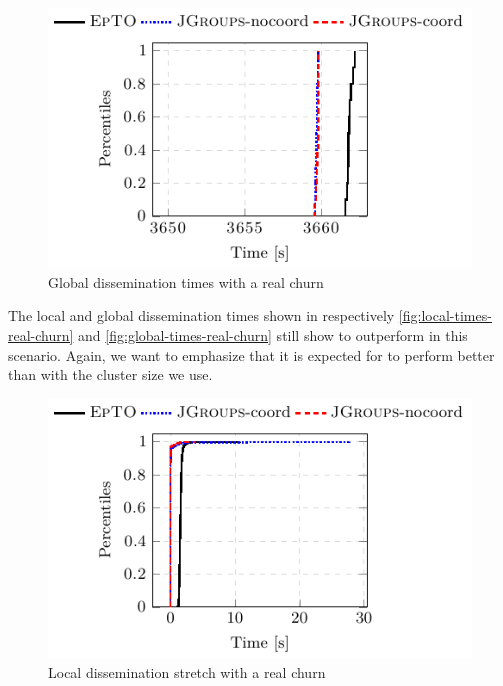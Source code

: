 \begin{figure}[hpt]
	\centering
	\includegraphics[width=\linewidth]{figures/global-times-real-churn.pdf}
	\vspace{-2mm} 
	\caption{Global dissemination times with a real churn}
	\vspace{-2mm} 
	\label{fig:global-times-real-churn} 
\end{figure}
The local and global dissemination times shown in respectively \autoref{fig:local-times-real-churn} and \autoref{fig:global-times-real-churn} still show \jgroups to outperform \epto in this scenario. Again, we want to emphasize that it is expected for \jgroups to perform better than \epto with the cluster size we use.
\par
\begin{figure}[hpt]
	\centering
	\includegraphics[width=\linewidth]{figures/local-diss-stretch-real-churn.pdf}
	\vspace{-2mm} 
	\caption{Local dissemination stretch with a real churn}
	\vspace{-2mm}
	\label{fig:local-delta-real-churn}   
\end{figure}
